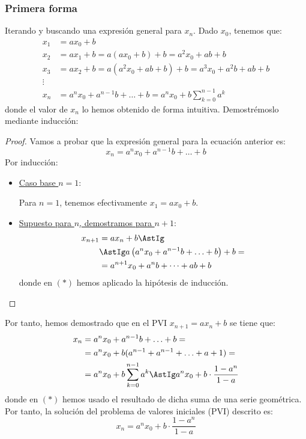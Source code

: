 \subsubsection{Primera forma}
Iterando y buscando una expresión general para $x_n$. Dado $x_0$, tenemos que:
\begin{align*}
    x_1 &= ax_0 + b\\
    x_2 &= ax_1 + b = a(ax_0 +b)+b = a^2 x_0 + ab + b\\
    x_3 &= ax_2 + b = a(a^2x_0 + ab +b )+ b = a^3 x_0 + a^2b + ab + b\\
    \vdots&\\
    x_n &= a^n x_0 + a^{n-1} b + \ldots + b = a^n x_0 + b\sum_{k=0}^{n-1} a^k
\end{align*}
donde el valor de $x_n$ lo hemos obtenido de forma intuitiva. Demostrémoslo mediante inducción:
\begin{proof}
    Vamos a probar que la expresión general para la ecuación anterior es:
    $$x_n = a^n x_0 + a^{n-1} b + \ldots + b$$
    Por inducción:
    \begin{itemize}
        \item \ul{Caso base $n = 1$}:
        
        Para $n=1$, tenemos efectivamente $x_1=ax_0+b$.
        
        \item \ul{Supuesto para $n$, demostramos para $n+1$}:
        \begin{align*}
            x_{n+1} &= ax_n + b \AstIg\\
            &\AstIg a\left(a^n x_0 + a^{n-1} b + \ldots + b\right)+b =\\
            &= a^{n+1}x_0 + a^nb + \dots + ab + b
        \end{align*}
        donde en $(\ast)$ hemos aplicado la hipótesis de inducción.
    \end{itemize}
\end{proof}
Por tanto, hemos demostrado que en el PVI $x_{n+1} = ax_n + b$ se tiene que:
\begin{align*}
    x_n &= a^n x_0 + a^{n-1} b + \ldots + b
    =\\&= a^n x_0 + b(a^{n-1} + a^{n-1} + \ldots + a + 1)
    =\\&= a^n x_0 + b\sum_{k=0}^{n-1}a^k \AstIg a^n x_0 + b\cdot \dfrac{1-a^n}{1-a}
\end{align*}
donde en $(\ast)$ hemos usado el resultado de dicha suma de una serie geométrica.
Por tanto, la solución del problema de valores iniciales (PVI) descrito es:
            $$x_n = a^n x_0 + b\cdot \dfrac{1-a^n}{1-a}$$

